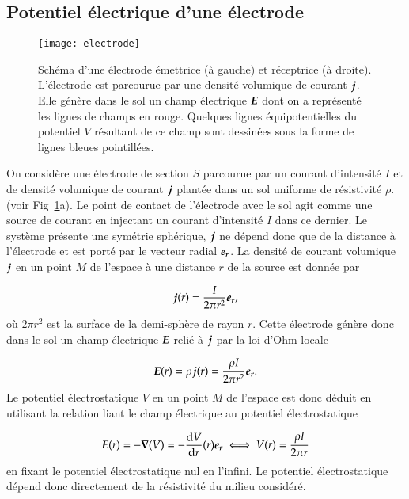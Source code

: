\subsection{Potentiel électrique d'une électrode}
\begin{figure}[]
	\centering
	\texttt{[image: electrode]}
	\caption{Schéma d'une électrode émettrice (à gauche) et réceptrice (à droite).
		 L'électrode est parcourue
	par une densité volumique de courant $\vecj$. Elle génère dans le sol
	un champ électrique $\vece$ dont on a représenté les lignes de champs en rouge.
	Quelques lignes équipotentielles du potentiel $V$ résultant de ce champ
	sont dessinées sous la forme de lignes bleues pointillées.}%
	\label{fig:electrode}
\end{figure}

On considère une électrode de section $S$ parcourue par un courant d'intensité $I$ 
et de densité volumique de courant $\vecj$ plantée dans un sol uniforme de résistivité
$\rho$. (voir Fig~\ref{fig:electrode}a). Le point de contact de l'électrode avec le sol
agit comme une source de courant en injectant un courant d'intensité $I$ dans
ce dernier. Le système présente une symétrie sphérique, $\vecj$ ne dépend donc 
que de la distance à l'électrode et est porté par le vecteur radial $\er$.
La densité de courant volumique $\vecj$ en un point $M$ de l'espace à une
distance $r$ de la source est donnée par

\begin{equation}
	\vecj(r) = \dfrac{I}{2 \pi r^2} \er,
\end{equation}
où $2 \pi r^2$ est la surface de la demi-sphère de rayon $r$.
Cette électrode génère donc dans le sol un champ électrique $\vece$ relié
à $\vecj$ par la loi d'Ohm locale

\begin{equation}
	\vece(r) = \rho \vecj(r) = \dfrac{\rho I}{2 \pi r^2} \er.
\end{equation}
Le potentiel électrostatique $V$ en un point $M$ de l'espace est donc déduit
en utilisant la relation liant le champ électrique au potentiel électrostatique

\begin{equation}
	\vece (r) = -\grad(V) = -\dfrac{\mathrm{d}V}{\dr}(r) \er 
	\iff V(r) = \dfrac{\rho I}{2 \pi r}
	\label{eq:potentiel}
\end{equation}
en fixant le potentiel électrostatique nul en l'infini.
Le potentiel électrostatique dépend donc directement de la résistivité du milieu
considéré.

